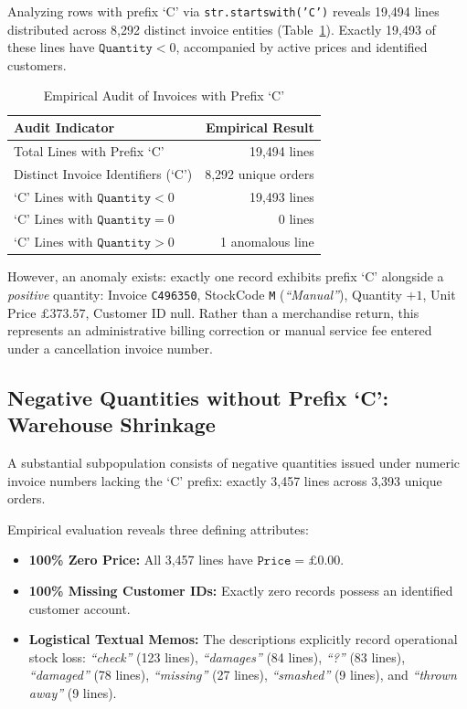 \documentclass[journal,10pt,twocolumn]{IEEEtran}
\begin{document}
Analyzing rows with prefix `C' via \texttt{str.startswith('C')} reveals 19,494 lines distributed across 8,292 distinct invoice entities (Table~\ref{tab:c_investigation}). Exactly 19,493 of these lines have $\texttt{Quantity} < 0$, accompanied by active prices and identified customers. 

\begin{table}[htbp]
\caption{Empirical Audit of Invoices with Prefix `C'}
\label{tab:c_investigation}
\centering
\begin{tabularx}{\columnwidth}{Xr}
\toprule
\textbf{Audit Indicator} & \textbf{Empirical Result} \\
\midrule
Total Lines with Prefix `C' & 19,494 lines \\
Distinct Invoice Identifiers (`C') & 8,292 unique orders \\
`C' Lines with $\texttt{Quantity} < 0$ & 19,493 lines \\
`C' Lines with $\texttt{Quantity} = 0$ & 0 lines \\
`C' Lines with $\texttt{Quantity} > 0$ & 1 anomalous line \\
\bottomrule
\end{tabularx}
\end{table}

However, an anomaly exists: exactly one record exhibits prefix `C' alongside a \textit{positive} quantity: Invoice \texttt{C496350}, StockCode \texttt{M} (\textit{``Manual''}), Quantity $+1$, Unit Price $\pounds 373.57$, Customer ID null. Rather than a merchandise return, this represents an administrative billing correction or manual service fee entered under a cancellation invoice number.

\subsection{Negative Quantities without Prefix `C': Warehouse Shrinkage}
A substantial subpopulation consists of negative quantities issued under numeric invoice numbers lacking the `C' prefix: exactly 3,457 lines across 3,393 unique orders.

Empirical evaluation reveals three defining attributes:
\begin{itemize}
    \item \textbf{100\% Zero Price:} All 3,457 lines have $\texttt{Price} = \pounds 0.00$.
    \item \textbf{100\% Missing Customer IDs:} Exactly zero records possess an identified customer account.
    \item \textbf{Logistical Textual Memos:} The descriptions explicitly record operational stock loss: \textit{``check''} (123 lines), \textit{``damages''} (84 lines), \textit{``?''} (83 lines), \textit{``damaged''} (78 lines), \textit{``missing''} (27 lines), \textit{``smashed''} (9 lines), and \textit{``thrown away''} (9 lines).
\end{itemize}
\end{document}
